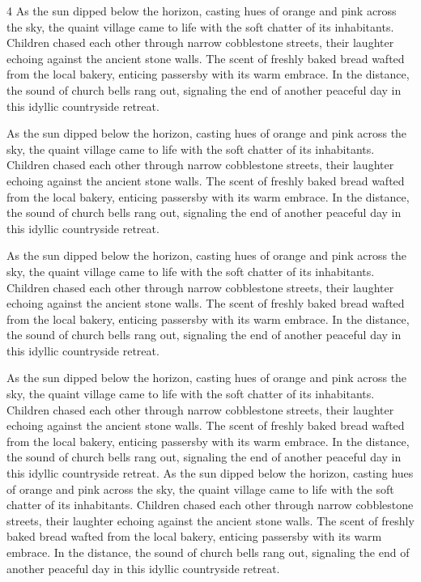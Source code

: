 \documentclass[a0]{4by3}
\newcommand{\NumColumns}{4}
\begin{document}
\begin{minipage}{\linewidth + 2\fboxsep}
\begin{multicols*}{\NumColumns}
        As the sun dipped below the horizon, casting hues of orange and pink across the sky, the quaint village came to life with the soft chatter of its inhabitants. Children chased each other through narrow cobblestone streets, their laughter echoing against the ancient stone walls. The scent of freshly baked bread wafted from the local bakery, enticing passersby with its warm embrace. In the distance, the sound of church bells rang out, signaling the end of another peaceful day in this idyllic countryside retreat.

As the sun dipped below the horizon, casting hues of orange and pink across the sky, the quaint village came to life with the soft chatter of its inhabitants. Children chased each other through narrow cobblestone streets, their laughter echoing against the ancient stone walls. The scent of freshly baked bread wafted from the local bakery, enticing passersby with its warm embrace. In the distance, the sound of church bells rang out, signaling the end of another peaceful day in this idyllic countryside retreat.

          \columnbreak  
 As the sun dipped below the horizon, casting hues of orange and pink across the sky, the quaint village came to life with the soft chatter of its inhabitants. Children chased each other through narrow cobblestone streets, their laughter echoing against the ancient stone walls. The scent of freshly baked bread wafted from the local bakery, enticing passersby with its warm embrace. In the distance, the sound of church bells rang out, signaling the end of another peaceful day in this idyllic countryside retreat.

  As the sun dipped below the horizon, casting hues of orange and pink across the sky, the quaint village came to life with the soft chatter of its inhabitants. Children chased each other through narrow cobblestone streets, their laughter echoing against the ancient stone walls. The scent of freshly baked bread wafted from the local bakery, enticing passersby with its warm embrace. In the distance, the sound of church bells rang out, signaling the end of another peaceful day in this idyllic countryside retreat.
 As the sun dipped below the horizon, casting hues of orange and pink across the sky, the quaint village came to life with the soft chatter of its inhabitants. Children chased each other through narrow cobblestone streets, their laughter echoing against the ancient stone walls. The scent of freshly baked bread wafted from the local bakery, enticing passersby with its warm embrace. In the distance, the sound of church bells rang out, signaling the end of another peaceful day in this idyllic countryside retreat.

    
    
\end{multicols*}
\end{minipage}

\nocite{unsplash}
\footnotesize
\end{document}
